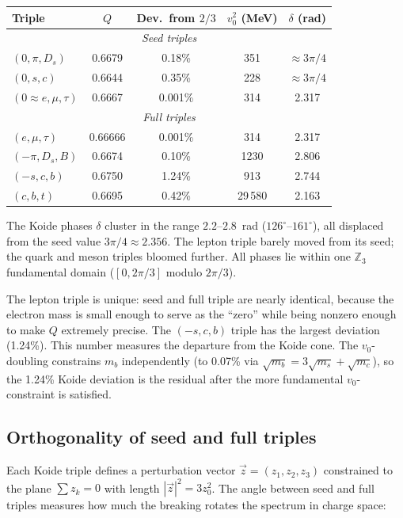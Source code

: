 \documentclass[12pt,a4paper]{article}
\begin{document}
\begin{center}
\begin{tabular}{lcccc}
\toprule
Triple & $Q$ & Dev.\ from $2/3$ & $v_0^2$ (MeV) & $\delta$ (rad) \\
\midrule
\multicolumn{5}{c}{\textit{Seed triples}} \\
$(0, \pi, D_s)$ & 0.6679 & 0.18\% & 351 & $\approx 3\pi/4$ \\
$(0, s, c)$ & 0.6644 & 0.35\% & 228 & $\approx 3\pi/4$ \\
$(0 \approx e, \mu, \tau)$ & 0.6667 & 0.001\% & 314 & 2.317 \\
\midrule
\multicolumn{5}{c}{\textit{Full triples}} \\
$(e, \mu, \tau)$ & 0.66666 & 0.001\% & 314 & 2.317 \\
$(-\pi, D_s, B)$ & 0.6674 & 0.10\% & 1230 & 2.806 \\
$(-s, c, b)$ & 0.6750 & 1.24\% & 913 & 2.744 \\
$(c, b, t)$ & 0.6695 & 0.42\% & 29\,580 & 2.163 \\
\bottomrule
\end{tabular}
\end{center}

The Koide phases $\delta$ cluster in the range $2.2$--$2.8$~rad
($126^\circ$--$161^\circ$), all displaced from the seed value
$3\pi/4 \approx 2.356$. The lepton triple barely moved from its
seed; the quark and meson triples bloomed further. All phases
lie within one $\mathbb{Z}_3$ fundamental domain ($[0, 2\pi/3]$
modulo $2\pi/3$).

The lepton triple is unique: seed and full triple are nearly
identical, because the electron mass is small enough to serve as
the ``zero'' while being nonzero enough to make $Q$ extremely
precise. The $(-s,c,b)$ triple has the largest deviation (1.24\%).
This number measures the departure from the Koide cone. The $v_0$-doubling constrains
$m_b$ independently (to 0.07\% via $\sqrt{m_b} = 3\sqrt{m_s} +
\sqrt{m_c}$), so the 1.24\% Koide deviation is the residual after
the more fundamental $v_0$-constraint is satisfied.

\subsection{Orthogonality of seed and full triples}

Each Koide triple defines a perturbation vector 
$\vec{z} = (z_1, z_2, z_3)$ constrained to the plane $\sum z_k = 0$ 
with length $|\vec{z}|^2 = 3z_0^2$. The angle between seed and 
full triples measures how much the breaking rotates the spectrum 
in charge space:
\end{document}

